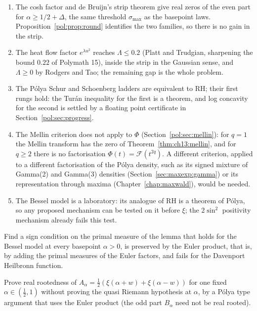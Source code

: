 \begin{enumerate}
\item The cosh factor and de Bruijn's strip theorem give real zeros of the even part for $\alpha\ge1/2+\Delta$, the same threshold $\sigma_{\max}$ as the basepoint laws. Proposition~\ref{pol:prop:round} identifies the two families, so there is no gain in the strip.
\item The heat flow factor $e^{\lambda u^2}$ reaches $\Lambda\le0.2$ (Platt and Trudgian, sharpening the bound $0.22$ of Polymath 15), inside the strip in the Gaussian sense, and $\Lambda\ge0$ by Rodgers and Tao; the remaining gap is the whole problem.
\item The P\'olya Schur and Schoenberg ladders are equivalent to RH; their first rungs hold: the Tur\'an inequality for the first is a theorem, and log concavity for the second is settled by a floating point certificate in Section~\ref{pol:sec:progress}.
\item The Mellin criterion does not apply to $\Phi$ (Section~\ref{pol:sec:mellin}): for $q=1$ the Mellin transform has the zero of Theorem~\ref{thm:ch13:mellin}, and for $q\ge2$ there is no factorisation $\Phi(t)=\mathcal F(t^{2q})$. A different criterion, applied to a different factorisation of the P\'olya density, such as its signed mixture of Gamma(2) and Gamma(3) densities (Section~\ref{sec:maxexp:gamma}) or its representation through maxima (Chapter~\ref{chap:maxwald}), would be needed.
\item The Bessel model is a laboratory: its analogue of RH is a theorem of P\'olya, so any proposed mechanism can be tested on it before $\xi$; the $2\sin^2$ positivity mechanism already fails this test.
\end{enumerate}

\begin{problem}\label{pol:op:sign}
Find a sign condition on the primal measure of the lemma that holds for the Bessel model at every basepoint $\alpha>0$, is preserved by the Euler product, that is, by adding the primal measures of the Euler factors, and fails for the Davenport Heilbronn function.
\end{problem}

\begin{problem}\label{pol:op:even}
Prove real rootedness of $A_\alpha=\frac12(\xi(\alpha+w)+\xi(\alpha-w))$ for one fixed $\alpha\in(\frac12,1)$ without proving the quasi Riemann hypothesis at $\alpha$, by a P\'olya type argument that uses the Euler product (the odd part $B_\alpha$ need not be real rooted).
\end{problem}

